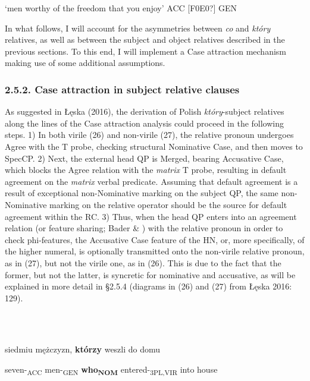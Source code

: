 \documentclass[output=paper]{langsci/langscibook}
\begin{document}
 ‘men worthy of the freedom that you enjoy’         ACC [F0E0?] GEN

In what follows, I will account for the asymmetries between \textit{co} and \textit{który} relatives, as well as between the subject and object relatives described in the previous sections. To this end, I will implement a Case attraction mechanism making use of some additional assumptions.  

\subsubsection{ 2.5.2. Case attraction in subject relative clauses}

As suggested in Łęska (2016), the derivation of Polish \textit{który}{}-subject relatives along the lines of the Case attraction analysis could proceed in the following steps. 1) In both virile (26) and non-virile (27), the relative pronoun undergoes Agree with the T probe, checking structural Nominative Case, and then moves to SpecCP. 2) Next, the external head QP is Merged, bearing Accusative Case, which blocks the Agree relation with the \textit{matrix} T probe, resulting in default agreement on the \textit{matrix} verbal predicate. Assuming that default agreement is a result of exceptional non-Nominative marking on the subject QP, the same non-Nominative marking on the relative operator should be the source for default agreement within the RC. 3) Thus, when the head QP enters into an agreement relation (or feature sharing; Bader \& \citealt{Bayer2006}) with the relative pronoun in order to check phi-features, the Accusative Case feature of the HN, or, more specifically, of the higher numeral, is optionally transmitted onto the non-virile relative pronoun, as in (27), but not the virile one, as in (26). This is due to the fact that the former, but not the latter, is syncretic for nominative and accusative, as will be explained in more detail in §2.5.4 (diagrams in (26) and (27) from Łęska 2016: 129).

\ea%
    \label{ex:key:26}
    \gll\\
        \\
    \glt
    \z

           siedmiu   mężczyzn,   \textbf{którzy}   weszli     do   domu

  seven-\textsubscript{ACC}   men-\textsubscript{GEN}   \textbf{who\textsubscript{NOM}}   entered-\textsubscript{3PL,VIR} into   house 

 
\end{document}
